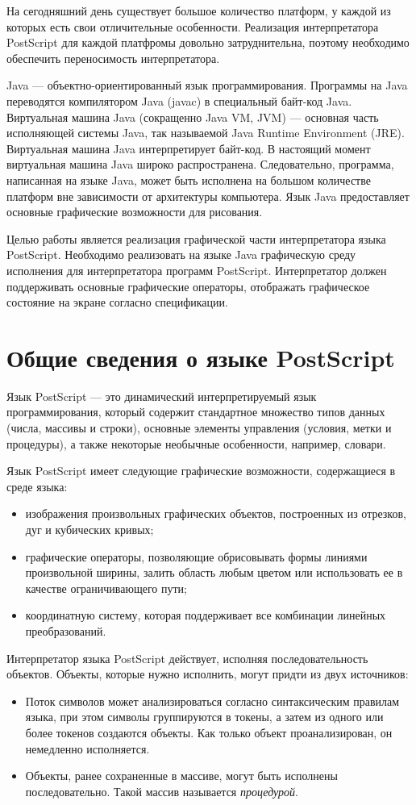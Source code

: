 На сегодняшний день существует большое количество платформ, у каждой из которых есть свои отличительные особенности. Реализация интерпретатора PostScript для каждой платфромы довольно затруднительна, поэтому  необходимо обеспечить переносимость интерпретатора. 

 Java --- объектно-ориентированный язык программирования. Программы на Java переводятся компилятором Java (javac)  в специальный байт-код Java. Виртуальная машина Java (сокращенно Java VM, JVM) --- основная часть исполняющей системы Java, так называемой Java Runtime Environment (JRE). Виртуальная машина Java интерпретирует байт-код. В настоящий момент виртуальная машина Java широко распространена. Следовательно, программа, написанная на языке Java, может быть исполнена на большом количестве платформ вне зависимости от архитектуры компьютера. Язык Java предоставляет основные графические возможности для рисования. 
 
Целью работы является реализация графической части интерпретатора языка PostScript.  Необходимо реализовать на языке Java графическую среду исполнения для интерпретатора программ PostScript. Интерпретатор должен поддерживать основные графические операторы, отображать графическое состояние на экране согласно спецификации.

\section{Общие сведения о языке PostScript}
Язык PostScript --- это динамический интерпретируемый язык программирования, который содержит стандартное множество типов данных (числа, массивы и строки), основные элементы управления (условия, метки и процедуры), а также некоторые необычные особенности, например, словари. 


Язык PostScript имеет следующие графические возможности, содержащиеся в среде языка:
\begin{itemize}
\item изображения произвольных графических объектов, построенных из отрезков, дуг и кубических кривых;
\item графические операторы, позволяющие обрисовывать формы линиями произвольной ширины, залить область любым цветом или использовать ее в качестве ограничивающего пути;
\item координатную систему, которая поддерживает все комбинации линейных преобразований.
\end{itemize}

 
Интерпретатор  языка PostScript действует, исполняя последовательность объектов. Объекты, которые нужно исполнить, могут придти из двух источников:
\begin{itemize}
\item Поток символов может анализироваться согласно синтаксическим правилам языка, при этом символы группируются в токены, а затем из одного или более токенов создаются объекты. Как только объект проанализирован, он немедленно исполняется. 
\item Объекты, ранее сохраненные в массиве, могут быть исполнены последовательно. Такой массив называется \textit{процедурой}.
\end{itemize} 
 
